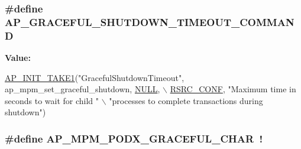 \subsubsection[{\texorpdfstring{A\+P\+\_\+\+G\+R\+A\+C\+E\+F\+U\+L\+\_\+\+S\+H\+U\+T\+D\+O\+W\+N\+\_\+\+T\+I\+M\+E\+O\+U\+T\+\_\+\+C\+O\+M\+M\+A\+ND}{AP_GRACEFUL_SHUTDOWN_TIMEOUT_COMMAND}}]{\setlength{\rightskip}{0pt plus 5cm}\#define A\+P\+\_\+\+G\+R\+A\+C\+E\+F\+U\+L\+\_\+\+S\+H\+U\+T\+D\+O\+W\+N\+\_\+\+T\+I\+M\+E\+O\+U\+T\+\_\+\+C\+O\+M\+M\+A\+ND}\hypertarget{group__APACHE__MPM_ga348087f11c2fdcd70e789dc9037d43ea}{}\label{group__APACHE__MPM_ga348087f11c2fdcd70e789dc9037d43ea}
{\bfseries Value\+:}
\begin{DoxyCode}
\hyperlink{group__APACHE__CORE__CONFIG_ga07c7d22ae17805e61204463326cf9c34}{AP\_INIT\_TAKE1}(\textcolor{stringliteral}{"GracefulShutdownTimeout"}, ap\_mpm\_set\_graceful\_shutdown, 
      \hyperlink{pcre_8txt_ad7f989d16aa8ca809a36bc392c07fba1}{NULL}, \(\backslash\)
              \hyperlink{group__ConfigDirectives_ga2c51f4c7392fa5af1afe797470dc16e3}{RSRC\_CONF}, \textcolor{stringliteral}{"Maximum time in seconds to wait for child "}        \(\backslash\)
              \textcolor{stringliteral}{"processes to complete transactions during shutdown"})
\end{DoxyCode}
\subsubsection[{\texorpdfstring{A\+P\+\_\+\+M\+P\+M\+\_\+\+P\+O\+D\+X\+\_\+\+G\+R\+A\+C\+E\+F\+U\+L\+\_\+\+C\+H\+AR}{AP_MPM_PODX_GRACEFUL_CHAR}}]{\setlength{\rightskip}{0pt plus 5cm}\#define A\+P\+\_\+\+M\+P\+M\+\_\+\+P\+O\+D\+X\+\_\+\+G\+R\+A\+C\+E\+F\+U\+L\+\_\+\+C\+H\+AR~\textquotesingle{}!\textquotesingle{}}\hypertarget{group__APACHE__MPM_ga0dd9e15b72435f3752fc723d4770c9b0}{}\label{group__APACHE__MPM_ga0dd9e15b72435f3752fc723d4770c9b0}
